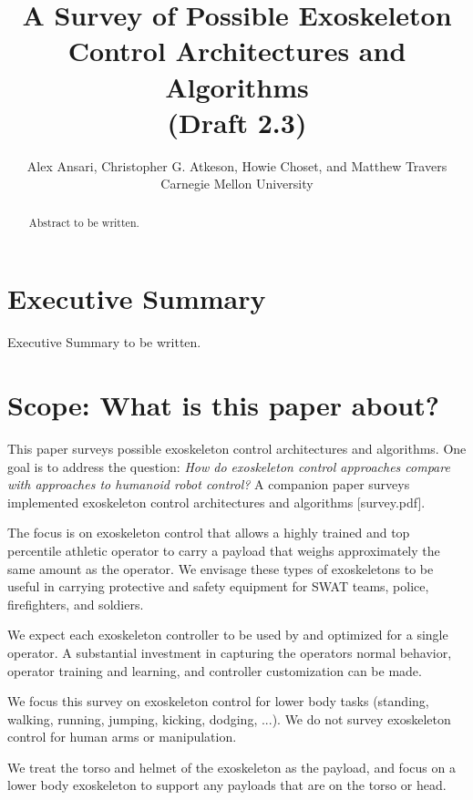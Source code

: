 \documentclass[letterpaper,12pt,fullpage]{article}
\begin{document}
\title{A Survey of Possible Exoskeleton Control Architectures and
Algorithms\\
(Draft 2.3)}

\author{Alex Ansari, Christopher G. Atkeson, Howie Choset, and Matthew Travers\\
Carnegie Mellon University}

\maketitle

\begin{abstract}
Abstract to be written.
\end{abstract}

\section{Executive Summary}

Executive Summary to be written.

\section{Scope: What is this paper about?}

This paper surveys possible exoskeleton control architectures and
algorithms.
One goal is to address the question:
{\it How do exoskeleton control approaches compare with 
approaches to humanoid robot control?}
A companion paper surveys implemented exoskeleton control architectures
and algorithms [survey.pdf].

The focus is on exoskeleton control that allows a
highly trained and top percentile athletic 
operator to carry a payload that weighs approximately the same amount
as the operator. We envisage these types of exoskeletons to be useful
in carrying protective and safety equipment for SWAT teams, police,
firefighters, and soldiers. 

We expect each exoskeleton controller
to be used by and optimized for a single operator.
A substantial investment in capturing the operators normal behavior,
operator training and learning, and controller customization can be made.

We focus this survey on exoskeleton control for lower body tasks (standing, walking,
running, jumping, kicking, dodging, ...).
We do not survey exoskeleton control for human arms or manipulation. 

We treat the torso and helmet of the exoskeleton as the payload,
and focus on a lower body exoskeleton to support any payloads that
are on the torso or head.
\end{document}
